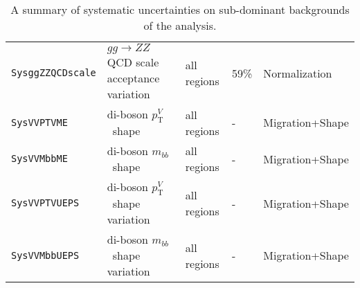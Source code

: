 \begin{landscape}
\begin{table}[hb]
\begin{tabular}{lllll}
      \texttt{SysggZZQCDscale} & $gg\to ZZ$ QCD scale acceptance variation & all regions & 59\% & Normalization\\
      \texttt{SysVVPTVME} & di-boson $p_{\mathrm{T}}^V$\ shape & all regions & - & Migration+Shape \\ 
      \texttt{SysVVMbbME} & di-boson $m_{bb}$\ shape & all regions & - & Migration+Shape \\ 
      \texttt{SysVVPTVUEPS} & di-boson $p_{\mathrm{T}}^V$\ shape variation & all regions & - & Migration+Shape \\
      \texttt{SysVVMbbUEPS} & di-boson $m_{bb}$\ shape variation & all regions & - & Migration+Shape\\
      \bottomrule
    \end{tabular}
    \caption[A summary of systematic uncertainties on sub-dominant backgrounds of
    the analysis.]{A summary of systematic uncertainties on sub-dominant
      backgrounds of the analysis.}
    \label{tab:small_bkg_systematics}
  \end{table}
\end{landscape}